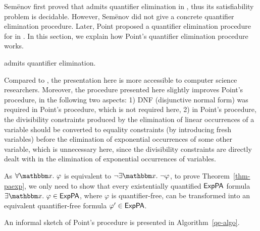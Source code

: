 
Semënov first proved that  {\paexp} admits quantifier elimination in \cite{Semenov84}, thus its satisfiability problem is decidable. However, Semënov did not give a concrete quantifier elimination procedure. Later, Point proposed a quantifier elimination procedure for {\paexp} in \cite{Point86}. In this section, we explain how Point's quantifier elimination procedure works. 

\vspace*{-3mm}

\begin{theorem}
\label{thm-paexp}
{\paexp} admits quantifier elimination. 
\end{theorem}
\vspace*{-3mm}

Compared to \cite{Point86}, the presentation here is more accessible to computer science researchers. Moreover, the procedure presented here slightly improves Point's procedure, in the following two aspects: 1) DNF (disjunctive normal form) was required in Point's procedure, which is not required here, 2) in Point's procedure, the divisibility constraints produced by the elimination of linear occurrences of a variable should be converted to equality constraints (by introducing fresh variables) before the elimination of exponential occurrences of some other variable, which is unnecessary here, since the divisibility constraints are directly dealt with in the elimination of exponential occurrences of variables. 

As $\forall \ivarx. \ \varphi$ is equivalent to $\neg \exists \ivarx. \ \neg \varphi$, to prove Theorem~\ref{thm-paexp}, we only need to show that every existentially quantified ${\sf ExpPA}$ formula $\exists \ivarx.\ \varphi \in \paexp$, where $\varphi$ is quantifier-free, can be transformed into an equivalent quantifier-free formula $\varphi' \in {\sf ExpPA}$. 

An informal sketch of Point's procedure is presented in Algorithm~\ref{qe-algo}.


